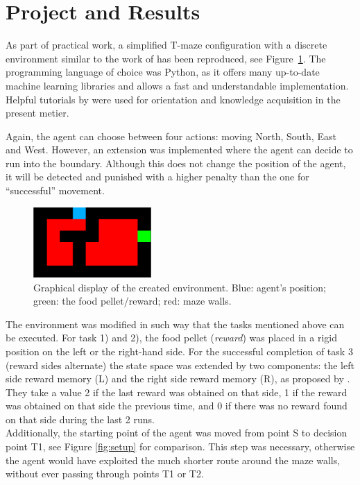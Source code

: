 \documentclass[a4paper]{article}
\begin{document}
	\section{Project and Results}
	\label{sec:project}
	As part of practical work, a simplified T-maze configuration with a discrete environment similar to the work of \cite{NeuralDynaQ} has been reproduced, see Figure~\ref{fig:ui}. The programming language of choice was Python, as it offers many up-to-date machine learning libraries and allows a fast and understandable implementation. Helpful tutorials by \citet{harrison.2019} were used for orientation and knowledge acquisition in the present metier. 
	\par Again, the agent can choose between four actions: moving North, South, East and West. However, an extension was implemented where the agent can decide to run into the boundary. Although this does not change the position of the agent, it will be detected and punished with a higher penalty than the one for ``successful'' movement.\\
	\begin{figure}[b]
		\centering
		\includegraphics[angle=0,width=0.4\textwidth]{./figs/Environment.png}
		\caption{\label{fig:ui} Graphical display of the created environment. Blue: agent's position; green: the food pellet/reward; red: maze walls.}
	\end{figure}
	\par The environment was modified in such way that the tasks mentioned above can be executed. For task 1) and 2), the food pellet (\textit{reward}) was placed in a rigid position on the left or the right-hand side.  For the successful completion of task 3 (reward sides alternate) the state space was extended by two components: the left side reward memory (L) and the right side reward memory (R), as proposed by \citet{NeuralDynaQ}. They take a value 2 if the last reward was obtained on that side, 1 if the reward was obtained on that side the previous time, and 0 if there was no reward found on that side during the last 2 runs. \\
	Additionally, the starting point of the agent was moved from point S to decision point T1, see Figure \ref{fig:setup} for comparison. This step was necessary, otherwise the agent would have exploited the much shorter route around the maze walls, without ever passing through points T1 or T2.\\
\end{document}
